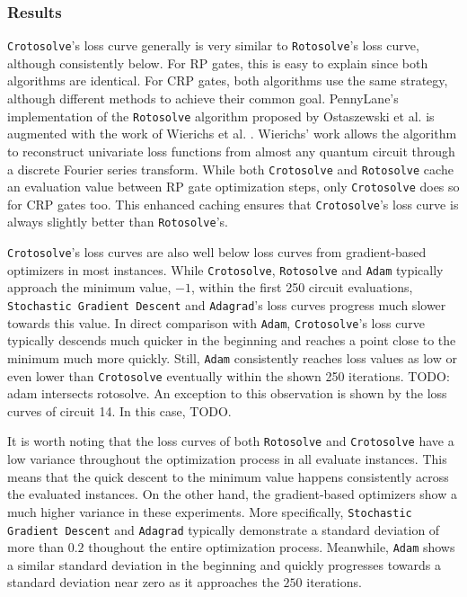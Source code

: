 
\subsubsection*{Results}

\texttt{Crotosolve}'s loss curve generally is very similar to
\texttt{Rotosolve}'s loss curve, although consistently below.
For RP gates, this is easy to explain since both algorithms are identical.
For CRP gates, both algorithms use the same strategy, although different methods
to achieve their common goal.
PennyLane's implementation of the \texttt{Rotosolve} algorithm proposed by
Ostaszewski et al. is augmented with the work of Wierichs et al.
\cite{ostaszewski_structure_2021,wierichs_general_2022,bergholm_pennylane_2022}.
Wierichs' work allows the algorithm to reconstruct univariate loss functions
from almost any quantum circuit through a discrete Fourier series transform.
While both \texttt{Crotosolve} and \texttt{Rotosolve} cache an evaluation value
between RP gate optimization steps, only \texttt{Crotosolve} does so for
CRP gates too.
This enhanced caching ensures that \texttt{Crotosolve}'s loss curve is always
slightly better than \texttt{Rotosolve}'s.

\texttt{Crotosolve}'s loss curves are also well below loss curves from
gradient-based optimizers in most instances.
While \texttt{Crotosolve}, \texttt{Rotosolve} and \texttt{Adam} typically
approach the minimum value, $-1$, within the first 250 circuit evaluations,
\texttt{Stochastic Gradient Descent} and \texttt{Adagrad}'s loss curves progress
much slower towards this value.
In direct comparison with \texttt{Adam}, \texttt{Crotosolve}'s loss curve
typically descends much quicker in the beginning and reaches a point close to
the minimum much more quickly.
Still, \texttt{Adam} consistently reaches loss values as low or even lower than
\texttt{Crotosolve} eventually within the shown 250 iterations.
TODO: adam intersects rotosolve.
An exception to this observation is shown by the loss curves of circuit 14.
In this case, TODO.

It is worth noting that the loss curves of both \texttt{Rotosolve} and
\texttt{Crotosolve} have a low variance throughout the optimization process in
all evaluate instances.
This means that the quick descent to the minimum value happens consistently
across the evaluated instances.
On the other hand, the gradient-based optimizers show a much higher variance in
these experiments.
More specifically, \texttt{Stochastic Gradient Descent} and \texttt{Adagrad}
typically demonstrate a standard deviation of more than $0.2$ thoughout the
entire optimization process.
Meanwhile, \texttt{Adam} shows a similar standard deviation in the beginning and
quickly progresses towards a standard deviation near zero as it approaches the
$250$ iterations.

